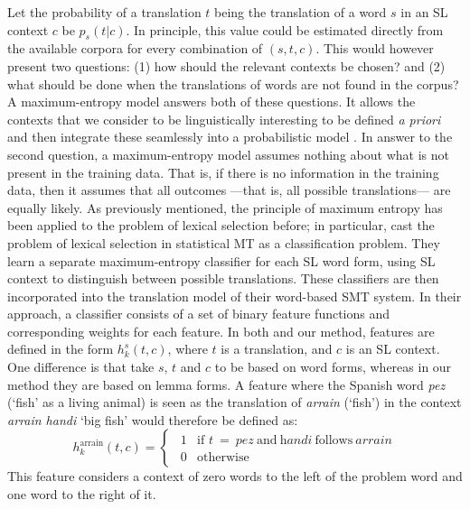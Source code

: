 \documentclass[11pt]{article}
\newcommand{\comment}[1]{\todo{#1}}
\begin{document}
Let the probability of a translation $t$ being the translation of a
word $s$ in an SL context $c$ be $p_s(t|c)$. In principle, this value
could be estimated directly from the available corpora for every
combination of $(s, t, c)$.  This would however present two questions:
(1) how should the relevant contexts be chosen? and (2) what should be
done when the translations of words are not found in the corpus?  A
maximum-entropy model answers both of these questions. It allows the
contexts that we consider to be linguistically interesting to be
defined \emph{a priori} and then integrate these seamlessly into a
probabilistic model \citep{Manning99b}.  In answer to the second
question, a maximum-entropy model assumes nothing about what is not
present in the training data. That is, if there is no information in
the training data, then it assumes that all outcomes ---that is, all
possible translations--- are equally likely.  As previously mentioned,
the principle of maximum entropy has been applied to the problem of
lexical selection before; in particular, \cite{berger1996} cast the
problem of lexical selection in statistical MT as a classification
problem. They learn a separate maximum-entropy classifier for each SL
word form,
using SL context to
distinguish between possible translations. These classifiers are then
incorporated into the translation model of their word-based SMT
system.
In their approach, a
classifier consists of a set of binary feature functions and
corresponding weights for each feature. 
In both \cite{berger1996} and our method, features are defined in the
form $h_k^{s}(t, c)$, where $t$
is a translation, and $c$ is an SL context. One difference is that \cite{berger1996} take $s$, $t$
and $c$ to be based on word forms, whereas in our method they are based
on lemma forms.
A feature where the Spanish word \emph{pez} (`fish' as a living animal) is seen as the
translation of \emph{arrain} (`fish') in the context \emph{arrain
  handi} `big fish' would therefore be defined as:
\begin{equation}
h_k^{\mathrm{arrain}}(t, c) = \left \{ \begin{matrix}
                 ~~1 & \mbox{if } t~ =~ \textit{pez}~ \mathrm{and}~ \textit{handi}~ \mathrm{follows}~ \textit{arrain}   \\
                 ~~0 & \mbox{otherwise} \end{matrix} \right.
\label{eq:feat-func}
\end{equation}
This feature considers a context of zero words to the left of the
problem word and one word to the right of it.
\end{document}
